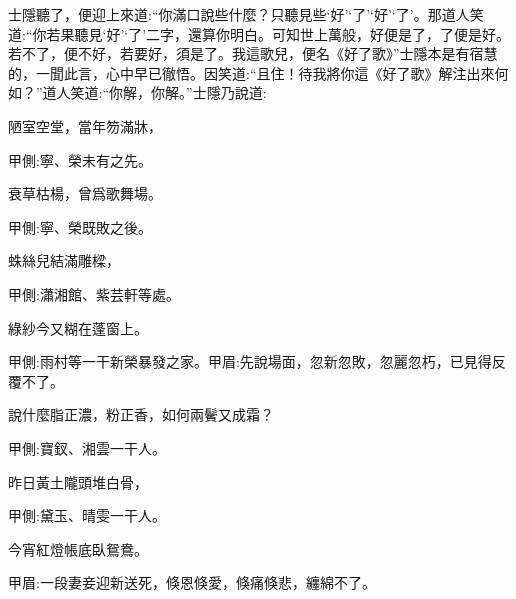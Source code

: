 \begin{parag}
    士隱聽了，便迎上來道:“你滿口說些什麼？只聽見些‘好’‘了’‘好’‘了’。那道人笑道:“你若果聽見‘好’‘了’二字，還算你明白。可知世上萬般，好便是了，了便是好。若不了，便不好，若要好，須是了。我這歌兒，便名《好了歌》”士隱本是有宿慧的，一聞此言，心中早已徹悟。因笑道:“且住！待我將你這《好了歌》解注出來何如？”道人笑道:“你解，你解。”士隱乃說道:
\end{parag}


\begin{poem}
    \begin{pl}陋室空堂，當年笏滿牀，\end{pl}\begin{note}甲側:寧、榮未有之先。\end{note}

    \begin{pl}衰草枯楊，曾爲歌舞場。\end{pl}\begin{note}甲側:寧、榮既敗之後。\end{note}

    \begin{pl}蛛絲兒結滿雕樑，\end{pl}\begin{note}甲側:瀟湘館、紫芸軒等處。\end{note}

    \begin{pl}綠紗今又糊在蓬窗上。\end{pl}\begin{note}甲側:雨村等一干新榮暴發之家。甲眉:先說場面，忽新忽敗，忽麗忽朽，已見得反覆不了。\end{note}

    \begin{pl}說什麼脂正濃，粉正香，如何兩鬢又成霜？\end{pl}\begin{note}甲側:寶釵、湘雲一干人。\end{note}

    \begin{pl}昨日黃土隴頭堆白骨，\end{pl}\begin{note}甲側:黛玉、晴雯一干人。\end{note}

    \begin{pl}今宵紅燈帳底臥鴛鴦。\end{pl}\begin{note}甲眉:一段妻妾迎新送死，倏恩倏愛，倏痛倏悲，纏綿不了。\end{note}


\end{poem}
